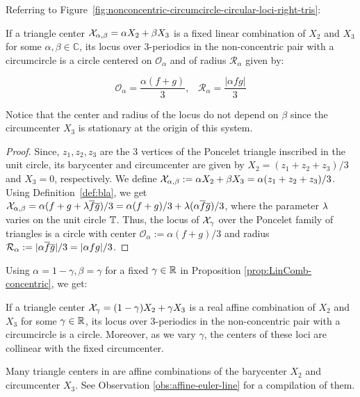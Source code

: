 Referring to Figure~\ref{fig:nonconcentric-circumcircle-circular-loci-right-tris}:

\begin{proposition}
If a triangle center $\mathcal{X}_{\alpha,\beta}=\alpha X_2+ \beta X_3$ is a fixed linear combination of $X_2$ and $X_3$ for some $\alpha,\beta\in\mathbb{C}$, its locus over 3-periodics in the non-concentric pair with a circumcircle is a circle centered on $\mathcal{O}_\alpha$ and of radius $\mathcal{R}_\alpha$ given by:

\[ \mathcal{O}_\alpha = \frac{\alpha(f+g)}{3},\;\;\; \mathcal{R}_\alpha =\frac{|\alpha f g|}{3}\]
\label{prop:LinComb-concentric}
\end{proposition}

\begin{observation}
Notice that the center and radius of the locus do not depend on $\beta$ since the circumcenter $X_3$ is stationary at the origin of this system.
\end{observation}

\begin{proof}
Since, $z_1,z_2,z_3$ are the 3 vertices of the Poncelet triangle inscribed in the unit circle, its barycenter and circumcenter are given by $X_2=(z_1+z_2+z_3)/3$ and $X_3=0$, respectively. We define $\mathcal{X}_{\alpha,\beta}:=\alpha X_2+ \beta X_3=\alpha (z_1+z_2+z_3)/3$. Using Definition~\ref{def:bla}, we get $\mathcal{X}_{\alpha,\beta}=\alpha(f+g+\lambda \overline{f}\overline{g})/3=\alpha(f+g)/3+\lambda(\alpha \overline{f}\overline{g})/3$, where the parameter $\lambda$ varies on the unit circle $\mathbb{T}$. Thus, the locus of $\mathcal{X}_{\gamma}$ over the Poncelet family of triangles is a circle with center $\mathcal{O}_{\alpha}:=\alpha(f+g)/3$ and radius $\mathcal{R}_{\alpha}:=|\alpha \overline{f}\overline{g}|/3=|\alpha f g|/3$.
\end{proof}

Using $\alpha=1-\gamma, \beta=\gamma$ for a fixed $\gamma\in\mathbb{R}$ in Proposition \ref{prop:LinComb-concentric}, we get:

\begin{corollary}
 If a triangle center $\mathcal{X}_\gamma=(1-\gamma) X_2+ \gamma X_3$ is a real affine combination of $X_2$ and $X_3$ for some $\gamma\in\mathbb{R}$, its locus over 3-periodics in the non-concentric pair with a circumcircle is a circle. Moreover, as we vary $\gamma$, the centers of these loci are collinear with the fixed circumcenter.
 \label{cor:gamma-with-circumcircle}
\end{corollary}

Many triangle centers in \cite{etc} are affine combinations of the barycenter $X_2$ and circumcenter $X_3$. See Observation \ref{obs:affine-euler-line} for a compilation of them.

